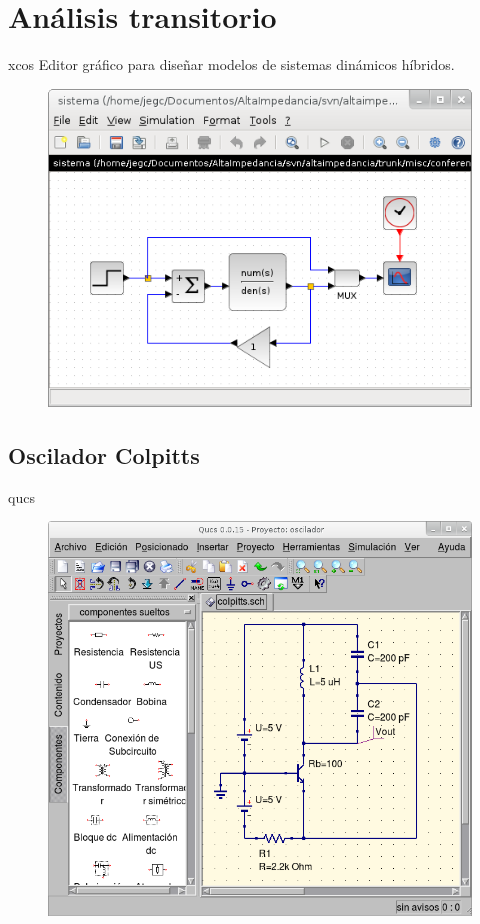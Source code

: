 \documentclass{beamer}
\begin{document}
\section{Análisis transitorio}


\begin{frame}{xcos}
  Editor gráfico para diseñar modelos de sistemas dinámicos híbridos.
  \begin{figure}
    \centering
    \includegraphics[scale=0.6]{scilab/img/xcos.png}
  \end{figure}
\end{frame}

\subsection{Oscilador Colpitts}

\begin{frame}{qucs}
  \begin{figure}
    \centering
    \includegraphics[scale=0.3]{qucs/img/qucs-colpitts.png}
  \end{figure}
\end{frame}
\end{document}
